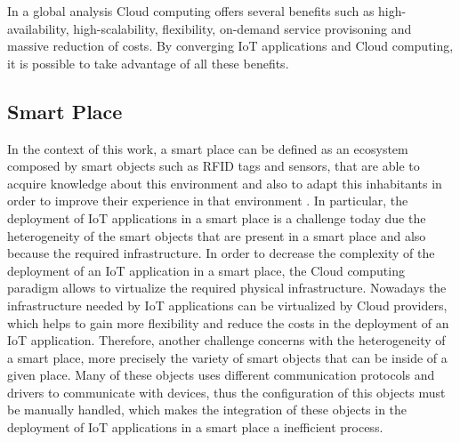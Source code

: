In a global analysis Cloud computing offers several benefits such as high-availability, high-scalability, flexibility, on-demand service provisoning and massive reduction of costs. By converging IoT applications and Cloud computing, it is possible to take advantage
of all these benefits.
\subsection{Smart Place}
\label{sub:smart_place}
In the context of this work, a smart place can be defined as an ecosystem composed by smart objects such as RFID tags and sensors, that are able to
acquire knowledge about this environment and also to adapt this inhabitants in order to improve their experience in that environment \cite{cook2004smart}.
In particular, the deployment of IoT applications in a smart place is a challenge today due the heterogeneity of the smart objects that are present in a smart place
and also because the required infrastructure. In order to decrease the complexity of the deployment of an IoT application in a smart place, the Cloud computing paradigm allows to
virtualize the required physical infrastructure. Nowadays the infrastructure needed by IoT applications can be virtualized by Cloud providers, which helps to gain more flexibility and reduce the costs in the deployment of an IoT application. Therefore, another challenge concerns with the heterogeneity
of a smart place, more precisely the variety of smart objects that can be inside of a given place. Many of these objects uses different communication protocols and drivers to communicate with devices,
thus the configuration of this objects must be manually handled, which makes the integration of these objects in the deployment of IoT applications in a smart place a inefficient process.
